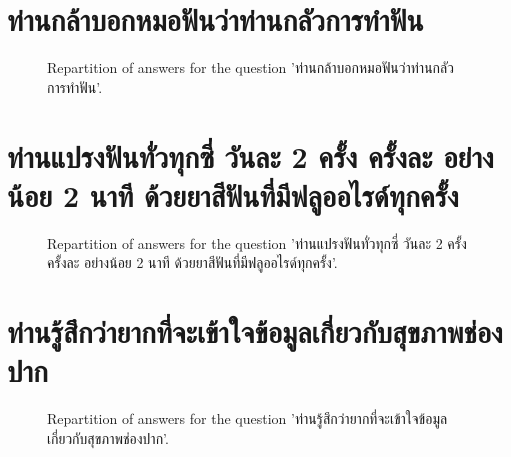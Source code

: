 \documentclass[12pt]{article}
\begin{document}
\clearpage{}
\section{ท่านกล้าบอกหมอฟันว่าท่านกลัวการทำฟัน}

\label{sec:117}


\begin{figure}[h!]
    \caption{\label{figure:q117-1}Repartition of answers for the question 'ท่านกล้าบอกหมอฟันว่าท่านกลัวการทำฟัน'.}
\end{figure}



\clearpage{}
\section{ท่านแปรงฟันทั่วทุกซี่ วันละ 2 ครั้ง ครั้งละ อย่างน้อย 2 นาที ด้วยยาสีฟันที่มีฟลูออไรด์ทุกครั้ง}

\label{sec:118}


\begin{figure}[h!]
    \caption{\label{figure:q118-1}Repartition of answers for the question 'ท่านแปรงฟันทั่วทุกซี่ วันละ 2 ครั้ง ครั้งละ อย่างน้อย 2 นาที ด้วยยาสีฟันที่มีฟลูออไรด์ทุกครั้ง'.}
\end{figure}



\clearpage{}
\section{ท่านรู้สึกว่ายากที่จะเข้าใจข้อมูลเกี่ยวกับสุขภาพช่องปาก}

\label{sec:119}


\begin{figure}[h!]
    \caption{\label{figure:q119-1}Repartition of answers for the question 'ท่านรู้สึกว่ายากที่จะเข้าใจข้อมูลเกี่ยวกับสุขภาพช่องปาก'.}
\end{figure}
\end{document}
